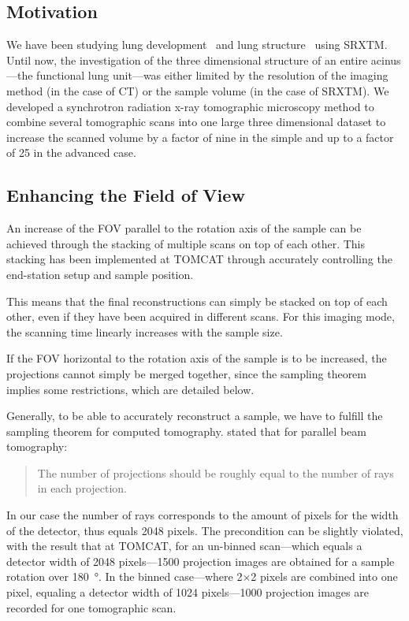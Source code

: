 \subsection{Motivation}
\label{subsec:motivation}
We have been studying lung development~\cite{Schittny2008,Mund2008} and lung structure~\cite{Tsuda2008} using SRXTM. Until now, the investigation of the three dimensional structure of an entire acinus---the functional lung unit---was either limited by the resolution of the imaging method (in the case of \micro CT) or the sample volume (in the case of SRXTM). We developed a synchrotron radiation x-ray tomographic microscopy method to combine several tomographic scans into one large three dimensional dataset to increase the scanned volume by a factor of nine in the simple and up to a factor of 25 in the advanced case.

\subsection{Enhancing the Field of View}
\label{subsec:enhancing the field of view}
An increase of the FOV parallel to the rotation axis of the sample can be achieved through the stacking of multiple scans on top of each other. This stacking has been implemented at TOMCAT through accurately controlling the end-station setup and sample position.

This means that the final reconstructions can simply be stacked on top of each other, even if they have been acquired in different scans. For this imaging mode, the scanning time linearly increases with the sample size.

If the FOV horizontal to the rotation axis of the sample is to be increased, the projections cannot simply be merged together, since the sampling theorem implies some restrictions, which are detailed below.

Generally, to be able to accurately reconstruct a sample, we have to fulfill the sampling theorem for computed tomography. \citet{Kak2002} stated that for parallel beam tomography: \begin{quote} The number of projections should be roughly equal to the number of rays in each projection. \end{quote} In our case the number of rays corresponds to the amount of pixels for the width of the detector, thus equals 2048 pixels. The precondition can be slightly violated, with the result that at TOMCAT, for an un-binned scan---which equals a detector width of 2048 pixels---1500 projection images are obtained for a sample rotation over \SI{180}{\degree}. In the binned case---where 2\(\times\)2 pixels are combined into one pixel, equaling a detector width of 1024 pixels---1000 projection images are recorded for one tomographic scan.

